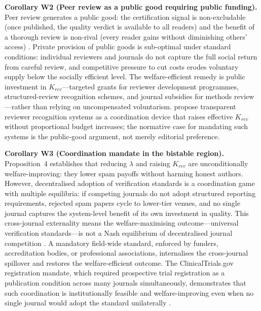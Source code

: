 \documentclass{article}
\begin{document}
\medskip
\noindent\textbf{Corollary W2 (Peer review as a public good requiring public funding).}
Peer review generates a public good: the certification signal is non-excludable (once published, the quality verdict is available to all readers) and the benefit of a thorough review is non-rival (every reader gains without diminishing others' access) \citep{DasguptaDavid1994}.
Private provision of public goods is sub-optimal under standard conditions: individual reviewers and journals do not capture the full social return from careful review, and competitive pressure to cut costs erodes voluntary supply below the socially efficient level.
The welfare-efficient remedy is public investment in $K_{rev}$---targeted grants for reviewer development programmes, structured-review recognition schemes, and journal subsidies for methods review---rather than relying on uncompensated voluntarism.
\citet{Aczel2021} propose transparent reviewer recognition systems as a coordination device that raises effective $K_{rev}$ without proportional budget increases; the normative case for mandating such systems is the public-good argument, not merely editorial preference.

\medskip
\noindent\textbf{Corollary W3 (Coordination mandate in the bistable region).}
Proposition~4 establishes that reducing $\lambda$ and raising $K_{rev}$ are unconditionally welfare-improving: they lower spam payoffs without harming honest authors.
However, decentralised adoption of verification standards is a coordination game with multiple equilibria: if competing journals do not adopt structured reporting requirements, rejected spam papers cycle to lower-tier venues, and no single journal captures the system-level benefit of its own investment in quality.
This cross-journal externality means the welfare-maximising outcome---universal verification standards---is not a Nash equilibrium of decentralised journal competition \citep{Ostrom1990}.
A mandatory field-wide standard, enforced by funders, accreditation bodies, or professional associations, internalises the cross-journal spillover and restores the welfare-efficient outcome.
The ClinicalTrials.gov registration mandate, which required prospective trial registration as a publication condition across many journals simultaneously, demonstrates that such coordination is institutionally feasible and welfare-improving even when no single journal would adopt the standard unilaterally \citep{Moher2009}.
\end{document}
